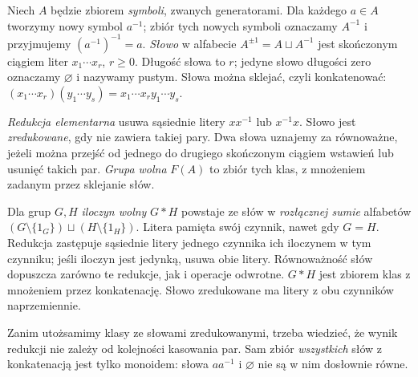 \begin{definicja}
\label{def:free-groups-5}
Niech $A$ będzie zbiorem \emph{symboli},
zwanych generatorami. Dla każdego $a\in A$
tworzymy nowy symbol $a^{-1}$;
zbiór tych nowych symboli oznaczamy $A^{-1}$
i przyjmujemy $(a^{-1})^{-1}=a$.
\emph{Słowo} w alfabecie
$A^{\pm1}=A\sqcup A^{-1}$ jest skończonym
ciągiem liter $x_1\cdots x_r$, $r\geq0$.
Długość słowa to $r$; jedyne słowo długości
zero oznaczamy $\varnothing$ i nazywamy pustym.
Słowa można sklejać, czyli konkatenować:
$(x_1\cdots x_r)(y_1\cdots y_s)
=x_1\cdots x_ry_1\cdots y_s$.

\emph{Redukcja elementarna} usuwa sąsiednie
litery $xx^{-1}$ lub $x^{-1}x$.
Słowo jest \emph{zredukowane}, gdy nie zawiera
takiej pary. Dwa słowa uznajemy za równoważne,
jeżeli można przejść od jednego do drugiego
skończonym ciągiem wstawień lub usunięć
takich par. \emph{Grupa wolna} $F(A)$
to zbiór tych klas, z mnożeniem zadanym
przez sklejanie słów.

Dla grup $G,H$ \emph{iloczyn wolny} $G*H$
powstaje ze słów w \emph{rozłącznej sumie} alfabetów
$(G\setminus\{1_G\})\sqcup(H\setminus\{1_H\})$.
Litera pamięta swój czynnik, nawet gdy $G=H$.
Redukcja zastępuje sąsiednie litery jednego czynnika
ich iloczynem w tym czynniku; jeśli iloczyn jest jedynką,
usuwa obie litery. Równoważność słów dopuszcza zarówno
te redukcje, jak i operacje odwrotne.
$G*H$ jest zbiorem klas z mnożeniem przez konkatenację.
Słowo zredukowane ma litery z obu czynników naprzemiennie.
\end{definicja}

Zanim utożsamimy klasy ze słowami zredukowanymi,
trzeba wiedzieć, że wynik redukcji nie zależy
od kolejności kasowania par. Sam zbiór
\emph{wszystkich} słów z konkatenacją
jest tylko monoidem: słowa $aa^{-1}$
i $\varnothing$ nie są w nim dosłownie równe.

